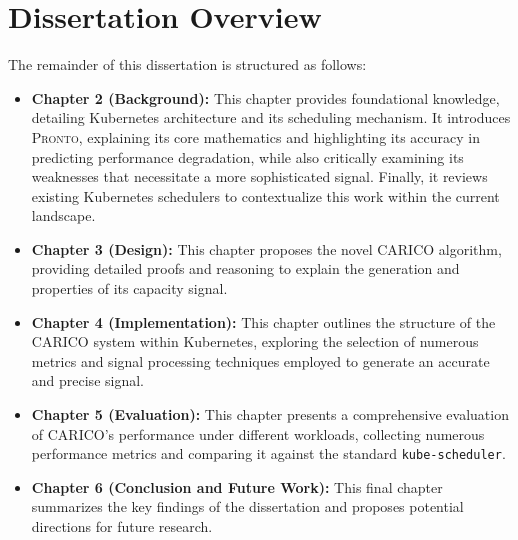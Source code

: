 \section{Dissertation Overview}
The remainder of this dissertation is structured as follows:
\begin{itemize}
    \item \textbf{Chapter 2 (Background):} This chapter provides foundational
        knowledge, detailing Kubernetes architecture and its scheduling
        mechanism. It introduces \textsc{Pronto}, explaining its core
        mathematics and highlighting its accuracy in predicting performance
        degradation, while also critically examining its weaknesses that
        necessitate a more sophisticated signal. Finally, it reviews existing
        Kubernetes schedulers to contextualize this work within the current
        landscape.
    \item \textbf{Chapter 3 (Design):} This chapter proposes the novel
        \textsc{CARICO} algorithm, providing detailed proofs and reasoning to
        explain the generation and properties of its capacity signal.
    \item \textbf{Chapter 4 (Implementation):} This chapter outlines the
        structure of the \textsc{CARICO} system within Kubernetes, exploring the
        selection of numerous metrics and signal processing techniques employed
        to generate an accurate and precise signal.
    \item \textbf{Chapter 5 (Evaluation):} This chapter presents a comprehensive
        evaluation of \textsc{CARICO}'s performance under different workloads,
        collecting numerous performance metrics and comparing it against the
        standard \texttt{kube-scheduler}.
    \item \textbf{Chapter 6 (Conclusion and Future Work):} This final chapter
        summarizes the key findings of the dissertation and proposes potential
        directions for future research.
\end{itemize}
